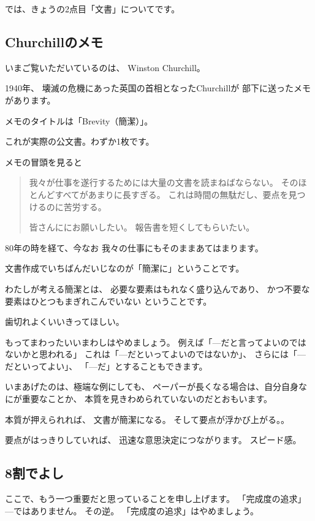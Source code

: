 \documentclass[uplatex,jis2004,dvipdfmx,12pt]{jsarticle}
\begin{document}
では、きょうの2点目「文書」についてです。

\subsection{Churchillのメモ}

いまご覧いただいているのは、
Winston Churchill。

1940年、
壊滅の危機にあった英国の首相となったChurchillが
部下に送ったメモがあります。

メモのタイトルは「Brevity（簡潔）」。

これが実際の公文書。わずか1枚です。

メモの冒頭を見ると

\begin{quote}
我々が仕事を遂行するためには大量の文書を読まねばならない。
そのほとんどすべてがあまりに長すぎる。
これは時間の無駄だし、要点を見つけるのに苦労する。

皆さんににお願いしたい。
報告書を短くしてもらいたい。
\end{quote}



80年の時を経て、今なお
我々の仕事にもそのままあてはまります。

文書作成でいちばんだいじなのが「簡潔に」ということです。

わたしが考える簡潔とは、
必要な要素はもれなく盛り込んであり、
かつ不要な要素はひとつもまぎれこんでいない
ということです。

歯切れよくいいきってほしい。

もってまわったいいまわしはやめましょう。
例えば「---だと言ってよいのではないかと思われる」
これは「---だといってよいのではないか」、
さらには「---だといってよい」、
「---だ」とすることもできます。


いまあげたのは、極端な例にしても、
ペーパーが長くなる場合は、自分自身なにが重要なことか、
本質を見きわめられていないのだとおもいます。

本質が押えられれば、
文書が簡潔になる。
そして要点が浮かび上がる。。


要点がはっきりしていれば、
迅速な意思決定につながります。
スピード感。

\subsection{8割でよし}

ここで、もう一つ重要だと思っていることを申し上げます。
「完成度の追求」---ではありません。
その逆。
「完成度の追求」はやめましょう。
\end{document}

